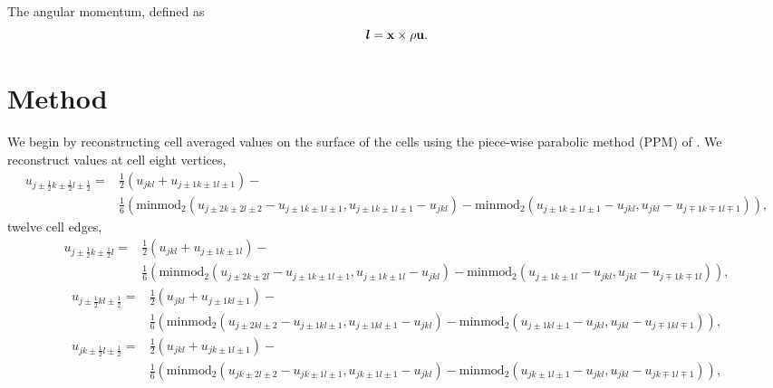 \documentclass{aastex63}
\begin{document}
The angular momentum, defined as
\begin{equation}
\am = \vect{x} \times \rho \vect{u}.
\end{equation}


\section{Method}
We begin by reconstructing cell averaged values on the surface of the cells using the piece-wise parabolic method (PPM) of \cite{COLELLA1984}. We reconstruct values at cell eight vertices, 
\begin{equation}
\begin{split}
u_{j \pm \tfrac{1}{2} k \pm \tfrac{1}{2} l \pm \tfrac{1}{2}} = & 
\frac{1}{2}\left(u_{ j k l } + u_{j \pm 1 k \pm 1 l \pm 1}\right) - \\
& \frac{1}{6}\left(
\mathrm{minmod}_2 \left(u_{j \pm 2 k \pm 2 l \pm 2} - u_{j \pm 1 k \pm 1 l \pm  1}, u_{j \pm 1 k \pm 1 l \pm 1} - u_{j k l }   \right) -
\mathrm{minmod}_2 \left(u_{j \pm 1 k \pm 1 l \pm 1} - u_{j k l}, u_{j k l } - u_{j \mp 1 k \mp 1 l \mp 1 }   \right)
\right),
\end{split}
\end{equation}
twelve cell edges, 
\begin{equation}
\begin{split}
u_{j \pm \tfrac{1}{2} k \pm \tfrac{1}{2} l } = & 
\frac{1}{2}\left(u_{ j k l } + u_{j \pm 1 k \pm 1 l}\right) - \\
& \frac{1}{6}\left(
\mathrm{minmod}_2 \left(u_{j \pm 2 k \pm 2 l} - u_{j \pm 1 k \pm 1 l \pm  1}, u_{j \pm 1 k \pm 1 l} - u_{j k l }   \right) -
\mathrm{minmod}_2 \left(u_{j \pm 1 k \pm 1 l} - u_{j k l}, u_{j k l } - u_{j \mp 1 k \mp 1 l}   \right)
\right),
\end{split}
\end{equation}
\begin{equation}
\begin{split}
u_{j \pm \tfrac{1}{2} k l \pm \tfrac{1}{2}} = & 
\frac{1}{2}\left(u_{ j k l } + u_{j \pm 1 k l \pm 1}\right) - \\
& \frac{1}{6}\left(
\mathrm{minmod}_2 \left(u_{j \pm 2 k l \pm 2} - u_{j \pm 1 k l \pm  1}, u_{j \pm 1 k l \pm 1} - u_{j k l }   \right) -
\mathrm{minmod}_2 \left(u_{j \pm 1 k l \pm 1} - u_{j k l}, u_{j k l } - u_{j \mp 1 k l \mp 1 }   \right)
\right),
\end{split}
\end{equation}
\begin{equation}
\begin{split}
u_{j k \pm \tfrac{1}{2} l \pm \tfrac{1}{2}} = & 
\frac{1}{2}\left(u_{ j k l } + u_{j k \pm 1 l \pm 1}\right) - \\
& \frac{1}{6}\left(
\mathrm{minmod}_2 \left(u_{j k \pm 2 l \pm 2} - u_{j k \pm 1 l \pm  1}, u_{j k \pm 1 l \pm 1} - u_{j k l }   \right) -
\mathrm{minmod}_2 \left(u_{j k \pm 1 l \pm 1} - u_{j k l}, u_{j k l } - u_{j k \mp 1 l \mp 1 }   \right)
\right),
\end{split}
\end{equation}
\end{document}
